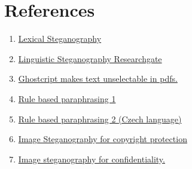 \documentclass{article}
\begin{document}
\section{References}
\begin{enumerate}
\item \href{https://www.researchgate.net/publication/229025905_The_Syntax_of_Concealment_Reliable_Methods_for_Plain_Text_Information_Hiding}{Lexical Steganography}
\item \href{https://www.researchgate.net/publication/267767675_Syntactic_Bank-based_Linguistic_Steganography_Approach}{Linguistic Steganography Researchgate}
\item \href{https://stackoverflow.com/questions/28797418/replace-all-font-glyphs-in-a-pdf-by-converting-them-to-outline-shapes}{Ghostcript makes text unselectable in pdfs.}
\item \href{https://www.academia.edu/14415744/Template_Based_Shake_and_Bake_Paraphrasing}{Rule based paraphrasing 1}
\item \href{https://nlp.fi.muni.cz/raslan/2019/paper15-burgerova.pdf}{Rule based paraphrasing 2 (Czech language)}
\item \href{https://ph01.tci-thaijo.org/index.php/ecticit/article/view/252500}{Image Steganography for copyright protection}
\item \href{https://ieeexplore.ieee.org/document/9138073}{Image steganography for confidentiality.}
\end{enumerate}
\end{document}
